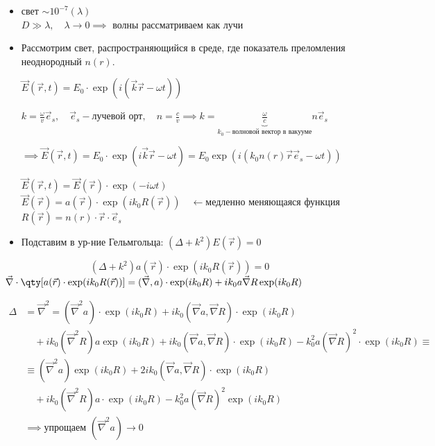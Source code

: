\begin{itemize}
	\item свет $\sim 10^{-7} (\lambda)$ \\
	$D \gg \lambda, \quad \lambda \to 0 \implies$ волны рассматриваем как лучи
	\item Рассмотрим свет, распространяющийся в среде, где показатель преломления неоднородный $n(r)$.
	
	$\vec{E}(\vec{r}, t) = E_0 \cdot \exp(i(\vec{k}\vec{r} - \omega t))$
	
	$k = \frac{\omega}{v} \vec{e}_s, \quad \vec{e}_s - \text{лучевой орт}, \quad n = \frac{c}{v} \implies k = \underbrace{\frac{\omega}{c}}_{k_0 - \text{волновой вектор в вакууме}} n \vec{e}_s$
	
	$\implies \vec{E}(\vec{r}, t) = E_0 \cdot \exp(i\vec{k}\vec{r} - \omega t) = E_0 \exp(i(k_0 n(r)\vec{r}\vec{e}_s - \omega t))$
	
	$\vec{E}(\vec{r}, t) = \vec{E}(\vec{r}) \cdot \exp(-i\omega t)$ \\
	$\vec{E}(\vec{r}) = a(\vec{r}) \cdot \exp(i k_0 R(\vec{r})) \quad \leftarrow \text{медленно меняющаяся функция}$ \\
	$R(\vec{r}) = n(r) \cdot \vec{r} \cdot \vec{e}_s$
	
	\item Подставим в ур-ние Гельмгольца: $(\Delta + k^2) E(\vec{r}) = 0$
\end{itemize}

\begin{equation*}
	(\Delta + k^2) a(\vec{r}) \cdot \exp(i k_0 R(\vec{r})) = 0
\end{equation*}
$\vec{\nabla} \cdot \qty[ a(\vec{r}) \cdot \exp(i k_0 R(\vec{r})) ] = (\vec{\nabla}, a) \cdot \exp(i k_0 R) + i k_0 a \vec{\nabla} R \exp(i k_0 R)$

\begin{align*}
	\Delta &= \vec{\nabla}^2 = (\vec{\nabla}^2 a) \cdot \exp(i k_0 R) + i k_0 (\vec{\nabla} a, \vec{\nabla} R) \cdot \exp(i k_0 R) \\
	&\quad + i k_0 (\vec{\nabla}^2 R) a \exp(i k_0 R) + i k_0 (\vec{\nabla} a, \vec{\nabla} R) \cdot \exp(i k_0 R) - k_0^2 a (\vec{\nabla} R)^2 \cdot \exp(i k_0 R) \equiv \\
	&\equiv (\vec{\nabla}^2 a) \exp(i k_0 R) + 2 i k_0 (\vec{\nabla} a, \vec{\nabla} R) \cdot \exp(i k_0 R) \\
	&\quad + i k_0 (\vec{\nabla}^2 R) a \cdot \exp(i k_0 R) - k_0^2 a (\vec{\nabla} R)^2 \exp(i k_0 R) \\
	&\implies \text{упрощаем } (\vec{\nabla}^2 a) \to 0
\end{align*}

